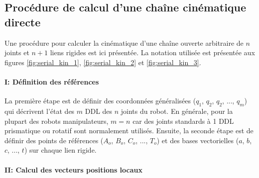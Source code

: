 \subsection{Procédure de calcul d'une chaîne cinématique directe}
\label{sec:cinedirectmethod}

Une procédure pour calculer la cinématique d'une chaîne ouverte arbitraire de $n$ joints et $n+1$ liens rigides est ici présentée. La notation utilisée est présentée aux figures \ref{fig:serial_kin_1}, \ref{fig:serial_kin_2} et \ref{fig:serial_kin_3}.

\paragraph{I: Définition des références}

La première étape est de définir des coordonnées généralisées ($q_1$, $q_2$, $q_2$, ..., $q_m$) qui décrivent l'état des $m$ DDL des $n$ joints du robot. En générale, pour la plupart des robots manipulateurs, $m=n$ car des joints standards à 1 DDL prismatique ou rotatif sont normalement utilisés. Ensuite, la seconde étape est de définir des points de références ($A_o$, $B_o$, $C_o$, ..., $T_o$) et des bases vectorielles ($a$, $b$, $c$, ..., $t$) sur chaque lien rigide.


\paragraph{II: Calcul des vecteurs positions locaux}

